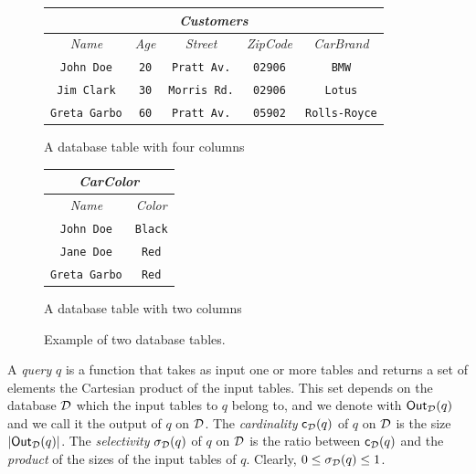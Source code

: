 \begin{figure}[htb]
  \begin{subtable}[b]{0.6\textwidth}
    \centering
    \begin{tabular}{c|c|c|c|c}
      \multicolumn{5}{c}{\emph{Customers}} \\
      \midrule
      \emph{Name} & \emph{Age} & \emph{Street} & \emph{ZipCode} & \emph{CarBrand} \\
      \midrule
      \texttt{John Doe} & \texttt{20} & \texttt{Pratt Av.} & \texttt{02906} & \texttt{BMW} \\
      \texttt{Jim Clark} &  \texttt{30} &\texttt{Morris Rd.} & \texttt{02906} & \texttt{Lotus} \\
      \texttt{Greta Garbo} & \texttt{60} & \texttt{Pratt Av.} & \texttt{05902} & \texttt{Rolls-Royce} \\
      \bottomrule
    \end{tabular}
    \caption{A database table with four columns}
  \end{subtable}
  \hfill
  \begin{subtable}[b]{0.3\textwidth}
    \centering
    \begin{tabular}{c|c}
      \multicolumn{2}{c}{\emph{CarColor}} \\
      \midrule
      \emph{Name} & \emph{Color} \\
      \midrule
      \texttt{John Doe} & \texttt{Black} \\
      \texttt{Jane Doe} & \texttt{Red} \\
      \texttt{Greta Garbo} & \texttt{Red}\\ 
      \bottomrule
    \end{tabular}
    \caption{A database table with two columns}
  \end{subtable}
  \caption{Example of two database tables.}
  \label{tab:example}
\end{figure}

A \emph{query} $q$ is a function that takes as input one or more tables and
returns a set of elements the Cartesian product of the input tables. This set
depends on the database ${\cal D}$ which the input tables to $q$ belong to, and we
denote with $\mathsf{Out}_{\cal D}(q)$ and we call it the output of $q$ on ${\cal D}$. The
\emph{cardinality} $\mathsf{c}_{\cal D}(q)$ of $q$ on ${\cal D}$ is the size
$|\mathsf{Out}_{\cal D}(q)|$. The \emph{selectivity} $\sigma_{\cal D}(q)$ of $q$ on ${\cal D}$ is
the ratio between $\mathsf{c}_{\cal D}(q)$ and the \emph{product} of the sizes of the
input tables of $q$.  Clearly, $0\le\sigma_{\cal D}(q)\le 1$.

